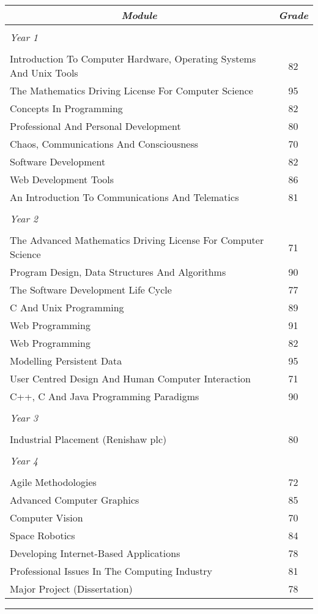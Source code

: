 \documentclass[a4paper, 10pt]{extarticle} %
\begin{document}
\vspace{20pt}

\begin{center}
\begin{tabular}{p{12cm}c}
\multicolumn{1}{c}{\textit{Module}} & \textit{Grade} \\ \hline
\\ \textit{Year 1} & \\ \\
Introduction To Computer Hardware, Operating Systems And Unix Tools & 82 \\
The Mathematics Driving License For Computer Science & 95 \\
Concepts In Programming & 82 \\
Professional And Personal Development & 80 \\
Chaos, Communications And Consciousness & 70 \\
Software Development & 82 \\
Web Development Tools & 86 \\
An Introduction To Communications And Telematics & 81 \\

\\ \textit{Year 2} & \\ \\
The Advanced Mathematics Driving License For Computer Science & 71 \\
Program Design, Data Structures And Algorithms & 90 \\
The Software Development Life Cycle & 77 \\
C And Unix Programming & 89 \\
Web Programming & 91 \\
Web Programming & 82 \\
Modelling Persistent Data & 95 \\
User Centred Design And Human Computer Interaction & 71 \\
C++, C And Java Programming Paradigms & 90 \\

\\ \textit{Year 3} & \\ \\
Industrial Placement (Renishaw plc) & 80 \\

\\ \textit{Year 4} & \\ \\
Agile Methodologies & 72 \\
Advanced Computer Graphics & 85 \\
Computer Vision & 70 \\
Space Robotics & 84 \\
Developing Internet-Based Applications & 78 \\
Professional Issues In The Computing Industry & 81 \\
Major Project (Dissertation) & 78 \\

\end{tabular}
\end{center}
\bigskip
\hrule
\bigskip
\end{document}
